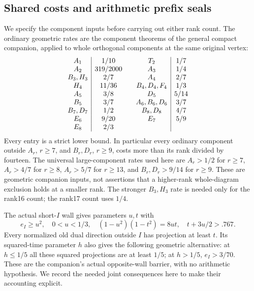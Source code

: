 \documentclass[11pt]{article}
\begin{document}
\subsection{Shared costs and arithmetic prefix seals}\label{subsec:shared-seals}

We specify the component inputs before carrying out either rank count.
The ordinary geometric rates are the component theorems of the general
compact companion, applied to whole orthogonal components at the same
original vertex:
\[
\begin{array}{c|c@{\qquad}c|c}
A_1&1/10&T_2&1/7\\
A_2&319/2000&A_3&1/4\\
B_3,H_3&2/7&A_4&2/7\\
H_4&11/36&B_4,D_4,F_4&1/3\\
A_5&3/8&D_5&5/14\\
B_5&3/7&A_6,B_6,D_6&3/7\\
B_7,D_7&1/2&B_8,D_8&4/7\\
E_6&9/20&E_7&5/9\\
E_8&2/3&&
\end{array}
\]
Every entry is a strict lower bound. In particular every ordinary
component outside $A_r$, $r\ge7$, and $B_r,D_r$, $r\ge9$, costs
more than its rank divided by fourteen. The universal large-component
rates used here are $A_r>1/2$ for $r\ge7$, $A_r>4/7$ for $r\ge8$,
$A_r>5/7$ for $r\ge13$, and $B_r,D_r>9/14$ for $r\ge9$.
These are geometric companion inputs, not assertions that a higher-rank
whole-diagram exclusion holds at a smaller rank. The stronger $B_3,H_3$
rate is needed only for the rank16 count; the rank17 count uses $1/4$.

The actual short-$I$ wall gives parameters $u,t$ with
\begin{equation}\label{eq:Ibarrier}
 e_I\ge u^2,\quad0<u<1/3,\quad
 (1-u^2)(1-t^2)=8ut,\quad t+3u/2>.767.
\end{equation}
Every normalized old dual direction outside $I$ has projection at
least $t$. Its squared-time parameter $h$ also gives the following
geometric alternative: at $h\le1/5$ all these squared projections are
at least $1/5$; at $h>1/5$, $e_I>3/70$.
These are the companion's actual opposite-wall barrier, with no
arithmetic hypothesis. We record the needed joint consequences here
to make their accounting explicit.
\end{document}
